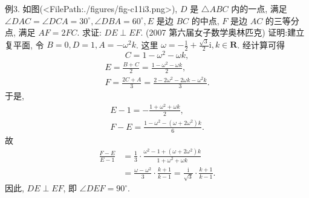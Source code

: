 例3. 如图(<FilePath:./figures/fig-c11i3.png>), $D$ 是 $\triangle A B C$ 内的一点, 满足 $\angle D A C=\angle D C A=30^{\circ}, \angle D B A=60^{\circ}, E$ 是边 $B C$ 的中点, $F$ 是边 $A C$ 的三等分点, 满足 $A F=2 F C$. 求证: $D E \perp E F$. (2007 第六届女子数学奥林匹克)
证明:建立复平面, 令 $B=0, D=1, A= -\omega^2 k$. 这里 $\omega=-\frac{1}{2}+\frac{\sqrt{3}}{2} \mathrm{i}, k \in \mathbf{R}$.
经计算可得
$$
C=1-\omega^2-\omega k,
$$
$$
\begin{gathered}
E=\frac{B+C}{2}=\frac{1-\omega^2-\omega k}{2}, \\
F=\frac{2 C+A}{3}=\frac{2-2 \omega^2-2 \omega k-\omega^2 k}{3} .
\end{gathered}
$$
于是,
$$
\begin{gathered}
E-1=-\frac{1+\omega^2+\omega k}{2}, \\
F-E=\frac{1-\omega^2-\left(\omega+2 \omega^2\right) k}{6} .
\end{gathered}
$$
故
$$
\begin{aligned}
\frac{F-E}{E-1} & =\frac{1}{3} \cdot \frac{\omega^2-1+\left(\omega+2 \omega^2\right) k}{1+\omega^2+\omega k} \\
& =\frac{\omega-\omega^2}{3} \cdot \frac{k+1}{k-1}=\frac{\mathrm{i}}{\sqrt{3}} \cdot \frac{k+1}{k-1} .
\end{aligned}
$$
因此, $D E \perp E F$, 即 $\angle D E F=90^{\circ}$.



